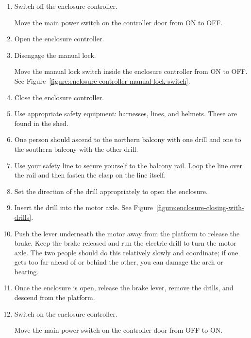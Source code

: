 \begin{enumerate}
\item Switch off the enclosure controller.

Move the main power switch on the controller door from ON to OFF.

\item
Open the enclosure controller.

\item
Disengage the manual lock.

Move the manual lock switch inside the enclosure controller from ON to OFF. See Figure~\ref{figure:enclosure-controller-manual-lock-switch}.

\item
Close the enclosure controller.

\item
Use appropriate safety equipment: harnesses, lines, and helmets. These are found in the shed.

\item
One person should ascend to the northern balcony with one drill and one to the southern balcony with the other drill.

\item
Use your safety line to secure yourself to the balcony rail. Loop the line over the rail and then fasten the clasp on the line itself.

\item
Set the direction of the drill appropriately to open the enclosure.

\item
Insert the drill into the motor axle. See Figure~\ref{figure:enclosure-closing-with-drills}.

\item
Push the lever underneath the motor away from the platform to release the brake. Keep the brake released and run the electric drill to turn the motor axle. The two people should do this relatively slowly and coordinate; if one gets too far ahead of or behind the other, you can damage the arch or bearing.

\item
Once the enclosure is open, release the brake lever, remove the drills, and descend from the platform.

\item
Switch on the enclosure controller.

Move the main power switch on the controller door from OFF to ON.

\end{enumerate}

